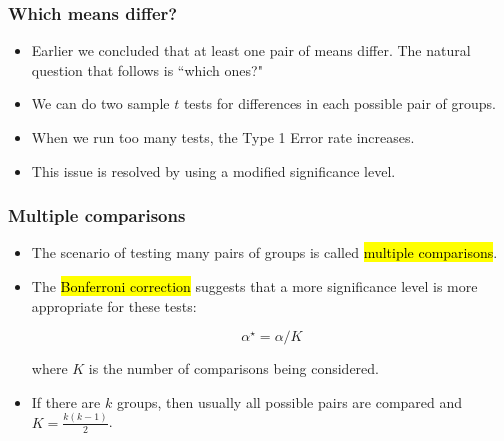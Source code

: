 \documentclass[slidestop,compress,mathserif]{beamer}
\begin{document}
\begin{frame}
\frametitle{Which means differ?}

\begin{itemize}

\item Earlier we concluded that at least one pair of means differ. The natural question that follows is ``which ones?"

\pause

\item We can do two sample $t$ tests for differences in each possible pair of groups.

\pause

\end{itemize}


\pause

\begin{itemize}

\item When we run too many tests, the Type 1 Error rate increases.

\item This issue is resolved by using a modified significance level.

\end{itemize}

\end{frame}


\begin{frame}
\frametitle{Multiple comparisons}

\begin{itemize}

\item The scenario of testing many pairs of groups is called \hl{multiple comparisons}.

\pause

\item The \hl{Bonferroni correction} suggests that a more  significance level is more appropriate for these tests:

\[ \alpha^\star = \alpha / K \]

where $K$ is the number of comparisons being considered.

\pause

\item If there are $k$ groups, then usually all possible pairs are compared and $K = \frac{k (k - 1)}{2}$.

\end{itemize}

\end{frame}
\end{document}
